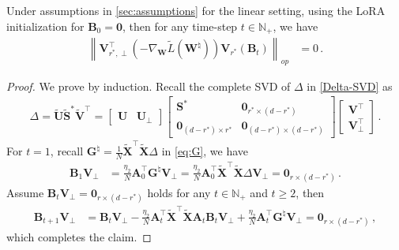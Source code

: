 \begin{theorem}
\label{linear-align-Bt}
    Under assumptions in \cref{sec:assumptions} for the linear setting, using the LoRA initialization for $\bm B_0 = \bm 0$, then for any time-step $t \in \mathbb{N}_+$, we have
    \begin{align*}
        \left\|\bm V^{\!\top}_{r^*,\perp}\left(-\nabla_{\bm W}\widetilde{L}(\bm W^\natural)\right)\bm V_{r^*}\left(\bm B_t\right)\right\|_{op} & = 0\,.
    \end{align*}
\end{theorem}
\begin{proof}
    We prove by induction. Recall the complete SVD of $\Delta$ in \cref{Delta-SVD} as
    \begin{align*}
    \Delta=\widetilde{\bm U} \widetilde{\bm S}^* \widetilde{\bm V}^{\!\top}=
    \begin{bmatrix}
        \bm U & \bm U_\perp
    \end{bmatrix}\begin{bmatrix}
       \bm S^* & \bm 0_{r^*\times (d-r^*)}\\
        \bm 0_{(d-r^*)\times r^*} & \bm 0_{(d-r^*)\times (d-r^*)}
    \end{bmatrix}\begin{bmatrix}
        \bm V^{\!\top} \\ \bm V_\perp^{\!\top}
    \end{bmatrix}\,.
\end{align*}
    For $t=1$, recall ${\bm G}^{\natural} = \frac{1}{N}\widetilde{\bm X}^{\!\top} \widetilde{\bm X}\Delta$ in \cref{eq:G}, we have
    \begin{align*}
        \bm B_1\bm V_\perp & = \frac{\eta_2}{N}\bm A_0^{\!\top}{\bm G}^{\natural}\bm V_\perp  = \frac{\eta_2}{N}\bm A_0^{\!\top}\widetilde{\bm X}^{\!\top}\widetilde{\bm X}\Delta\bm V_\perp = \bm 0_{r\times (d-r^*)}\,.
    \end{align*}
    Assume $\bm B_t\bm V_\perp = \bm 0_{r\times (d-r^*)}$ holds for any $t \in \mathbb{N}_+$ and $t \geq 2$, then
    \begin{align*}
        \bm B_{t+1}\bm V_\perp & = \bm B_t\bm V_\perp - \frac{\eta_2}{N}\bm A_t^{\!\top}\widetilde{\bm X}^{\!\top}\widetilde{\bm X}\bm A_t\bm B_t\bm V_\perp+\frac{\eta_2}{N}\bm A_t^{\!\top}{\bm G}^{\natural}\bm V_\perp= \bm 0_{r\times (d-r^*)}\,,
    \end{align*}
    which completes the claim. 
\end{proof}


